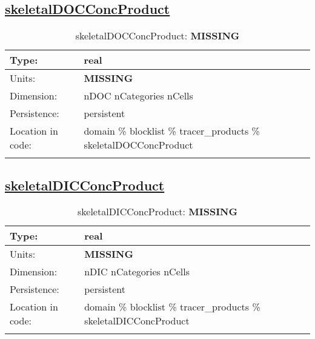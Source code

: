 \subsection[skeletalDOCConcProduct]{\hyperref[sec:var_tab_tracer_products]{skeletalDOCConcProduct}}
\label{subsec:var_sec_tracer_products_skeletalDOCConcProduct}
\begin{center}
\begin{longtable}{| p{2.0in} | p{4.0in} |}
        \hline 
        Type: & real \\
        \hline 
        Units: & {\bf \color{red} MISSING} \\
        \hline 
        Dimension: & nDOC nCategories nCells \\
        \hline 
        Persistence: & persistent \\
        \hline 
         Location in code: & domain \% blocklist \% tracer\_products \% skeletalDOCConcProduct \\
         \hline 
    \caption{skeletalDOCConcProduct: {\bf \color{red} MISSING}}
\end{longtable}
\end{center}
\subsection[skeletalDICConcProduct]{\hyperref[sec:var_tab_tracer_products]{skeletalDICConcProduct}}
\label{subsec:var_sec_tracer_products_skeletalDICConcProduct}
\begin{center}
\begin{longtable}{| p{2.0in} | p{4.0in} |}
        \hline 
        Type: & real \\
        \hline 
        Units: & {\bf \color{red} MISSING} \\
        \hline 
        Dimension: & nDIC nCategories nCells \\
        \hline 
        Persistence: & persistent \\
        \hline 
         Location in code: & domain \% blocklist \% tracer\_products \% skeletalDICConcProduct \\
         \hline 
    \caption{skeletalDICConcProduct: {\bf \color{red} MISSING}}
\end{longtable}
\end{center}
